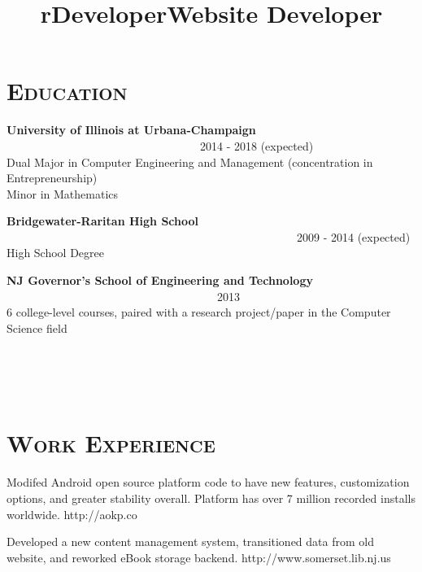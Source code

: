 \begin{resume}

\section{\textsc{Education}}

\textbf{University of Illinois at Urbana-Champaign} \ \ \ \ \ \ \ \ \ \ \ \ \ \ \ \ \ \ \ \ \ \ \ \ \ \ \ \ \ \ \ \ \ \ 2014 - 2018 (expected) \\
Dual Major in Computer Engineering and Management (concentration in Entrepreneurship) \\ Minor in Mathematics

\textbf{Bridgewater-Raritan High School} \ \ \ \ \ \ \ \ \ \ \ \ \ \ \ \ \ \ \ \ \ \ \ \ \ \ \ \ \ \ \ \ \ \ \ \ \ \ \ \ \ \ \ \ \ \ \ \ \ \ \ 2009 - 2014 (expected) \\
High School Degree

\textbf{NJ Governor's School of Engineering and Technology} \ \ \ \ \ \ \ \ \ \ \ \ \ \ \ \ \ \ \ \ \ \ \ \ \ \ \ \ \ \ \ \ \ \ \ \ \ 2013 \\ 
6 college-level courses, paired with a research project/paper in the Computer Science field

\begin{formatb}
  \title{r}\\
  \\
  \body\\
\end{formatb}

\section{\textsc{Work Experience}}

\title{Developer}
\begin{position}
Modifed Android open source platform code to have new features, customization options, and greater stability overall. Platform has over 7 million recorded installs worldwide. http://aokp.co
\end{position}

\title{Website Developer}
\begin{position}
Developed a new content management system, transitioned data from old website, and reworked eBook storage backend. http://www.somerset.lib.nj.us
\end{position}


\end{resume}
